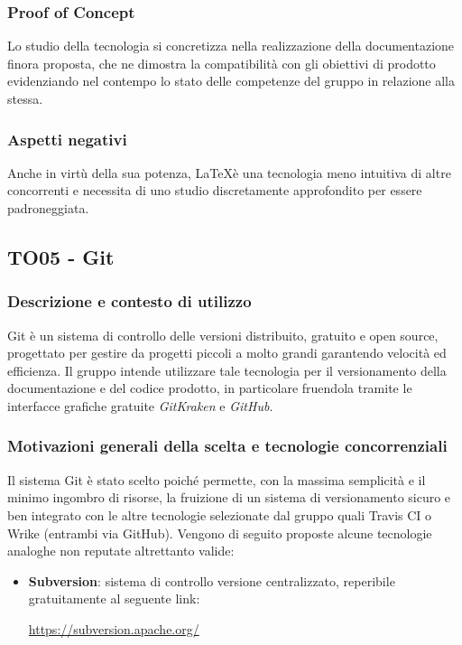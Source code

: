 \documentclass[./../Technology Baseline.tex]{subfiles}
\begin{document}
\subsubsection{Proof of Concept}
Lo studio della tecnologia si concretizza nella realizzazione della documentazione finora proposta, che ne dimostra la compatibilità con gli obiettivi di prodotto evidenziando nel contempo lo stato delle competenze del gruppo in relazione alla stessa.

\subsubsection{Aspetti negativi}
Anche in virtù della sua potenza, \LaTeX è una tecnologia meno intuitiva di altre concorrenti e necessita di uno studio discretamente approfondito per essere padroneggiata.

\subsection{TO05 - Git}

\subsubsection{Descrizione e contesto di utilizzo}
Git è un sistema di controllo delle versioni distribuito, gratuito e open source, progettato per gestire da progetti piccoli a molto grandi garantendo velocità ed efficienza. Il gruppo intende utilizzare tale tecnologia per il versionamento della documentazione e del codice prodotto, in particolare fruendola tramite le interfacce grafiche gratuite \textit{GitKraken} e \textit{GitHub}.

\subsubsection{Motivazioni generali della scelta e tecnologie concorrenziali}
Il sistema Git è stato scelto poiché permette, con la massima semplicità e il minimo ingombro di risorse, la fruizione di un sistema di versionamento sicuro e ben integrato con le altre tecnologie selezionate dal gruppo quali Travis CI o Wrike (entrambi via GitHub). Vengono di seguito proposte alcune tecnologie analoghe non reputate altrettanto valide:
\begin{itemize}
	\item \textbf{Subversion}: sistema di controllo versione centralizzato, reperibile gratuitamente al seguente link:
	\begin{center}
		\url{https://subversion.apache.org/}
	\end{center}
\end{itemize}
\end{document}
